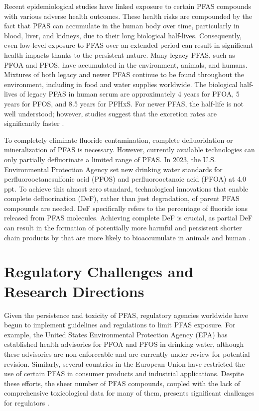 Recent epidemiological studies have linked exposure to certain PFAS compounds with various adverse health outcomes. These health risks are compounded by the fact that PFAS can accumulate in the human body over time, particularly in blood, liver, and kidneys, due to their long biological half-lives. Consequently, even low-level exposure to PFAS over an extended period can result in significant health impacts thanks to the persistent nature. Many legacy PFAS, such as PFOA and PFOS, have accumulated in the environment, animals, and humans. Mixtures of both legacy and newer PFAS continue to be found throughout the environment, including in food and water supplies worldwide. The biological half-lives of legacy PFAS in human serum are approximately 4 years for PFOA, 5 years for PFOS, and 8.5 years for PFHxS. For newer PFAS, the half-life is not well understood; however, studies suggest that the excretion rates are significantly faster \cite{4}.


To completely eliminate fluoride contamination, complete defluoridation or mineralization of PFAS is necessary. However, currently available technologies can only partially defluorinate a limited range of PFAS. In 2023, the U.S. Environmental Protection Agency set new drinking water standards for perfluorooctanesulfonic acid (PFOS) and perfluorooctanoic acid (PFOA) at 4.0 ppt. To achieve this almost zero standard, technological innovations that enable complete defluorination (DeF), rather than just degradation, of parent PFAS compounds are needed. DeF specifically refers to the percentage of fluoride ions released from PFAS molecules. Achieving complete DeF is crucial, as partial DeF can result in the formation of potentially more harmful and persistent shorter chain products by that are more likely to bioaccumulate in animals and human \cite{6}.



\section{Regulatory Challenges and Research Directions}

Given the persistence and toxicity of PFAS, regulatory agencies worldwide have begun to implement guidelines and regulations to limit PFAS exposure. For example, the United States Environmental Protection Agency (EPA) has established health advisories for PFOA and PFOS in drinking water, although these advisories are non-enforceable and are currently under review for potential revision. Similarly, several countries in the European Union have restricted the use of certain PFAS in consumer products and industrial applications. Despite these efforts, the sheer number of PFAS compounds, coupled with the lack of comprehensive toxicological data for many of them, presents significant challenges for regulators \cite{PFAS_regulators} \cite{PFAS_regulators_2} \cite{PFAS_regulators_3}.

